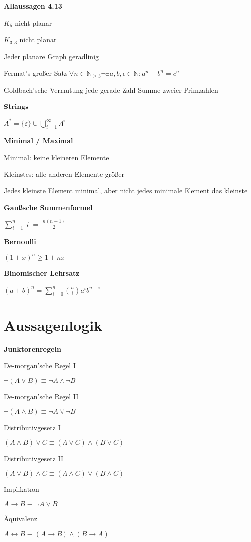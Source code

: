 \documentclass[a4paper,10pt]{article}
\newcommand{\N}{\mathbb{N}}
\begin{document}
\begin{multicols}{3}
\textbf{Allaussagen 4.13}

$K_5$ nicht planar

$K_{3,3}$ nicht planar

Jeder planare Graph geradlinig

Fermat's großer Satz $\forall n\in\N_{\ge 3} \neg \exists a,b,c\in\N: a^n + b^n = c^n$

Goldbach'sche Vermutung jede gerade Zahl Summe zweier Primzahlen

\textbf{Strings}

$A^* = \{\varepsilon\} \cup \bigcup_{i=1}^\infty A^i$

\textbf{Minimal / Maximal}

Minimal: keine kleineren Elemente

Kleinstes: alle anderen Elemente größer

Jedes kleinste Element minimal, aber nicht jedes minimale Element das kleinste

\textbf{Gaußsche Summenformel}

$\sum_{i=1}^n \; i \; = \; \frac{n(n+1)}{2}$

\textbf{Bernoulli}

$(1+x)^n \geq 1+nx$

\textbf{Binomischer Lehrsatz}

$(a+b)^n = \sum_{i=0}^n \binom{n}{i} a^i b^{n-i}$

\section{Aussagenlogik}

\textbf{Junktorenregeln}

De-morgan'sche Regel I

$\neg (A \vee B) \equiv \neg A \wedge \neg B$

De-morgan'sche Regel II

$\neg (A \wedge B) \equiv \neg A \vee \neg B$

Distributivgesetz I

$(A \wedge B)\vee C \equiv (A \vee C) \wedge (B \vee C)$

Distributivgesetz II

$(A \vee B)\wedge C \equiv (A \wedge C) \vee (B \wedge C)$

Implikation

$A\rightarrow B \equiv \neg A \vee B$

Äquivalenz

$A\leftrightarrow B \equiv (A \rightarrow B) \wedge (B \rightarrow A)$


\end{multicols}
\end{document}
